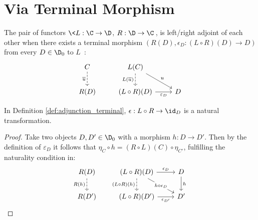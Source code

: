 \section{Via Terminal Morphism}

\begin{definition}[Adjunction]\label{def:adjunction_terminal}

  The pair of functors $\<L: \C\to \D$, $R: \D\to \C\>$, is left/right adjoint
  of each other when there exists a terminal morphism $(R(D), \epsilon_D:
  (L\circ R)(D) \to D)$ from every $D\in \D_0$ to
  $L$~\parencite[p.~214]{awodey:category_theory}:
  \[\begin{tikzcd}[ampersand replacement=\&]
    C \& {L(C)} \\
    {R(D)} \& {(L\circ R)(D)} \& D
    \arrow["{\overline{u}}"', dashed, from=1-1, to=2-1]
    \arrow["{L(\overline{u})}"', dashed, from=1-2, to=2-2]
    \arrow["{\varepsilon_D}"', from=2-2, to=2-3]
    \arrow["u", from=1-2, to=2-3]
  \end{tikzcd}\]
\end{definition}

\begin{theorem}
  In Definition \ref{def:adjunction_terminal}, $\epsilon: L\circ R \to \id_D$
  is a natural transformation.

  \begin{proof}
    Take two objects $D,D'\in \D_0$ with a morphism $h:D\to D'$. Then by the
    definition of $\varepsilon_{D}$ it follows that $\eta_C\circ h = (R\circ
    L)(C)\circ \eta_{C'}$, fulfilling the naturality condition in:
    \[\begin{tikzcd}[ampersand replacement=\&]
      {R(D)} \& {(L\circ R)(D)} \& D \\
      {R(D')} \& {(L\circ R)(D')} \& {D'}
      \arrow["h", from=1-3, to=2-3]
      \arrow["{R(h)}"', dashed, from=1-1, to=2-1]
      \arrow["{\epsilon_D}", from=1-2, to=1-3]
      \arrow["{\epsilon_{D'}}"', from=2-2, to=2-3]
      \arrow["{h\circ\epsilon_D}"{description}, from=1-2, to=2-3]
      \arrow["{(L\circ R)(h)}"', dashed, from=1-2, to=2-2]
    \end{tikzcd}\]
  \end{proof}
  \vspace{-\baselineskip}
\end{theorem}

